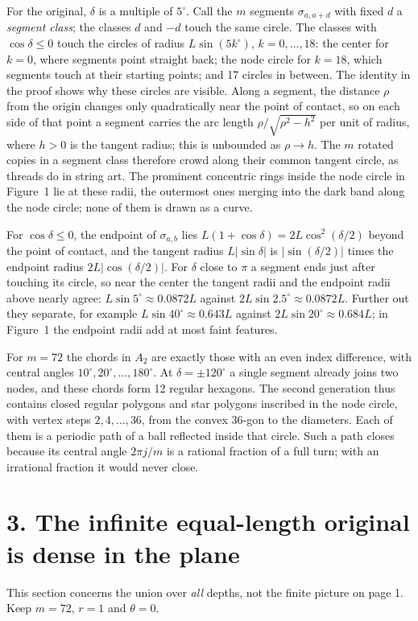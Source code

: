 \documentclass[11pt,a4paper]{article}
\newcommand{\sectiontitle}[1]{\section*{\sffamily\color{ink}#1}}
\begin{document}
For the original, $\delta$ is a multiple of $5^\circ$. Call the $m$ segments
$\sigma_{a,a+d}$ with fixed $d$ a \emph{segment class}; the classes $d$ and
$-d$ touch the same circle. The classes with $\cos\delta\le0$ touch the
circles of radius $L\sin(5k^\circ)$, $k=0,\ldots,18$: the center for $k=0$,
where segments point straight back; the node circle for $k=18$, which
segments touch at their starting points; and 17 circles in between. The
identity in the proof shows why these circles are visible. Along a segment,
the distance $\rho$ from the origin changes only quadratically near the
point of contact, so on each side of that point a segment carries the arc
length $\rho/\sqrt{\rho^2-h^2}$ per unit of radius, where $h>0$ is the
tangent radius; this is unbounded as $\rho\to h$. The $m$ rotated copies in
a segment class therefore crowd along their common tangent circle, as
threads do in string art. The prominent concentric rings inside the node
circle in Figure~1 lie at these radii, the outermost ones merging into the
dark band along the node circle; none of them is drawn as a curve.

For $\cos\delta\le0$, the endpoint of $\sigma_{a,b}$ lies
$L(1+\cos\delta)=2L\cos^2(\delta/2)$ beyond the point of contact, and the
tangent radius $L|\sin\delta|$ is $|\sin(\delta/2)|$ times the endpoint
radius $2L|\cos(\delta/2)|$. For $\delta$ close to $\pi$ a segment ends just
after touching its circle, so near the center the tangent radii and the
endpoint radii above nearly agree: $L\sin5^\circ\approx0.0872L$ against
$2L\sin2.5^\circ\approx0.0872L$. Further out they separate, for example
$L\sin40^\circ\approx0.643L$ against $2L\sin20^\circ\approx0.684L$; in
Figure~1 the endpoint radii add at most faint features.

For $m=72$ the chords in $A_2$ are exactly those with an even index
difference, with central angles $10^\circ,20^\circ,\ldots,180^\circ$. At
$\delta=\pm120^\circ$ a single segment already joins two nodes, and these
chords form 12 regular hexagons. The second generation thus contains closed
regular polygons and star polygons inscribed in the node circle, with vertex
steps $2,4,\ldots,36$, from the convex 36-gon to the diameters. Each of them
is a periodic path of a ball reflected inside that circle. Such a path
closes because its central angle $2\pi j/m$ is a rational fraction of a full
turn; with an irrational fraction it would never close.

\newpage
\sectiontitle{3. The infinite equal-length original is dense in the plane}
This section concerns the union over \emph{all} depths, not the finite
picture on page 1. Keep $m=72$, $r=1$ and $\theta=0$.
\end{document}
